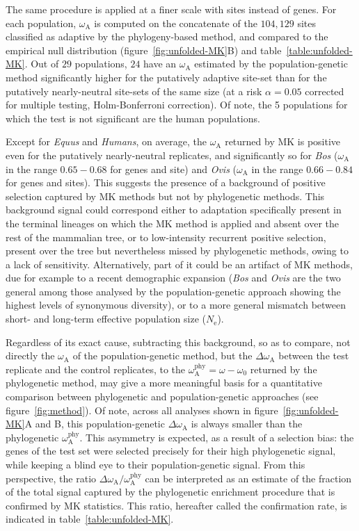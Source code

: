 \documentclass{article}
\newcommand{\Ne}{N_{\mathrm{e}}}
\newcommand{\rateApop}{\omega_{\mathrm{A}}}
\newcommand{\rateAphy}{\rateApop^{\mathrm{phy}}}
\begin{document}
    The same procedure is applied at a finer scale with sites instead of genes.
    For each population, $\rateApop$ is computed on the concatenate of the $104,129$ sites classified as adaptive by the phylogeny-based method, and compared to the empirical null distribution (figure~\ref{fig:unfolded-MK}B) and table~\ref{table:unfolded-MK}.
    Out of $29$ populations, $24$ have an $\rateApop$ estimated by the population-genetic method significantly higher for the putatively adaptive site-set than for the putatively nearly-neutral site-sets of the same size (at a risk $\alpha=0.05$ corrected for multiple testing, Holm-Bonferroni correction).
    Of note, the 5 populations for which the test is not significant are the human populations.

    Except for \textit{Equus} and \textit{Humans}, on average, the $\rateApop$ returned by MK is positive even for the putatively nearly-neutral replicates, and significantly so for \textit{Bos} ($\rateApop$ in the range $0.65-0.68$ for genes and site) and \textit{Ovis} ($\rateApop$ in the range $0.66-0.84$ for genes and sites).
    This suggests the presence of a background of positive selection captured by MK methods but not by phylogenetic methods.
    This background signal could correspond either to adaptation specifically present in the terminal lineages on which the MK method is applied and absent over the rest of the mammalian tree, or to low-intensity recurrent positive selection, present over the tree but nevertheless missed by phylogenetic methods, owing to a lack of sensitivity.
    Alternatively, part of it could be an artifact of MK methods, due for example to a recent demographic expansion (\textit{Bos} and \textit{Ovis} are the two general among those analysed by the population-genetic approach showing the highest levels of synonymous diversity), or to a more general mismatch between short- and long-term effective population size ($\Ne$)\cite{rousselle_overestimation_2018}.

    Regardless of its exact cause, subtracting this background, so as to compare, not directly the $\rateApop$ of the population-genetic method, but the $\Delta \rateApop$ between the test replicate and the control replicates, to the $\rateAphy= \omega - \omega_0$ returned by the phylogenetic method, may give a more meaningful basis for a quantitative comparison between phylogenetic and population-genetic approaches (see figure~\ref{fig:method}).
    Of note, across all analyses shown in figure~\ref{fig:unfolded-MK}A and B, this population-genetic $\Delta \rateApop$ is always smaller than the phylogenetic $\rateAphy$.
    This asymmetry is expected, as a result of a selection bias: the genes of the test set were selected precisely for their high phylogenetic signal, while keeping a blind eye to their population-genetic signal.
    From this perspective, the ratio $\Delta \rateApop /  \rateAphy$ can be interpreted as an estimate of the fraction of the total signal captured by the phylogenetic enrichment procedure that is confirmed by MK statistics.
    This ratio, hereafter called the confirmation rate, is indicated in table~\ref{table:unfolded-MK}.
\end{document}
